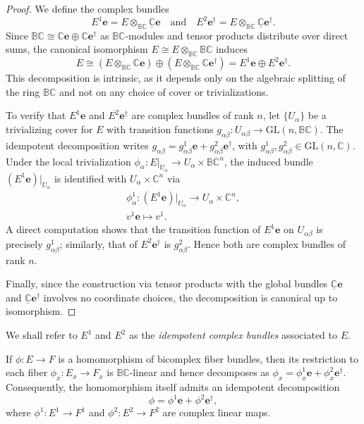 \documentclass[11pt]{amsart}
\newcommand{\BC}{\mathbb{BC}}       %
\newcommand{\C}{\mathbb{C}}          %
\newcommand{\e}{\mathbf{e}}          %
\newcommand{\ed}{\mathbf{e}^\dagger} %
\theoremstyle{definition}
\begin{document}
\begin{proof}
  We define the complex bundles
  \begin{equation*}
  E^1\e= E \otimes_{\BC} \underline{\C}\e \quad \text{and}\quad
  E^2\ed= E \otimes_{\BC} \underline{\C}\ed.
  \end{equation*}
  Since $\BC \cong \C\mathbf{e} \oplus \C\ed$ as $\BC$-modules and tensor products distribute over direct sums, the canonical isomorphism $E \cong E \otimes_{\BC} \BC$ induces
  \begin{equation*}
  E \cong (E \otimes_{\BC} \C\mathbf{e}) \oplus (E \otimes_{\BC} \C\ed) = E^1\e \oplus E^2\ed.
  \end{equation*}
  This decomposition is intrinsic, as it depends only on the algebraic splitting of the ring $\BC$ and not on any choice of cover or trivializations.

  To verify that $E^1\mathbf{e}$ and $E^2\ed$ are complex bundles of rank $n$, let $\{U_\alpha\}$ be a trivializing cover for $E$ with transition functions $g_{\alpha\beta}: U_{\alpha\beta} \to \mathrm{GL}(n,\BC)$. The idempotent decomposition writes $g_{\alpha\beta}=g_{\alpha\beta}^1\e+g_{\alpha\beta}^2\ed$, with $g_{\alpha\beta}^1,g_{\alpha\beta}^2\in \mathrm{GL}(n,\C)$. Under the local trivialization $\phi_\alpha: E|_{U_\alpha} \to U_\alpha \times \BC^n$, the induced bundle $(E^1\mathbf{e})|_{U_\alpha}$ is identified with $U_\alpha \times \C^n$ via
  \begin{gather*}
  \phi_\alpha^1: (E^1\e)|_{U_\alpha} \to U_\alpha \times \C^n, \\ v^1\e \mapsto v^1.
  \end{gather*}
  A direct computation shows that the transition function of $E^1\e$ on $U_{\alpha\beta}$ is precisely $g_{\alpha\beta}^1$; similarly, that of $E^2\ed$ is $g_{\alpha\beta}^2$. Hence both are complex bundles of rank $n$.

  Finally, since the construction via tensor products with the global bundles $\underline{\C}\e$ and $\underline{\C}\ed$ involves no coordinate choices, the decomposition is canonical up to isomorphism. 
\end{proof}



We shall refer to $E^1$ and $E^2$ as the \emph{idempotent complex bundles} associated to $E$.

If $\phi:E \to F$ is a homomorphism of bicomplex fiber bundles, then its restriction to each fiber $\phi_x:E_x \to F_x$ is $\BC$-linear and hence decomposes as $\phi_x = \phi_x^1 \e + \phi_x^2 \ed$. Consequently, the homomorphism itself admits an idempotent decomposition
    \begin{equation*}
        \phi = \phi^1 \e + \phi^2 \ed,
    \end{equation*}
    where $\phi^1:E^1 \to F^1$ and $\phi^2:E^2 \to F^2$ are complex linear maps.
 
\end{document}
